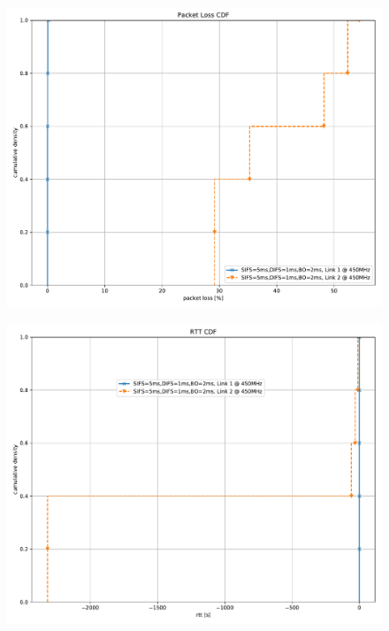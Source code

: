 \documentclass{article}
\begin{document}
\begin{figure}
	\includegraphics[width=\textwidth]{rb_low_dual/cdf/packet_loss_cdf}
\end{figure}

\begin{figure}
	\includegraphics[width=\textwidth]{rb_low_dual/cdf/rtt_cdf}
\end{figure}
\end{document}
